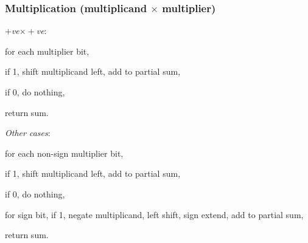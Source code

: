 \subsubsection*{Multiplication (multiplicand $\times$ multiplier)}
\emph{$+$ve$\times+$ve}: \begin{enumerate*}[label=(\arabic*)]
    \item for each multiplier bit,
    \item if 1, shift multiplicand left, add to partial sum,
    \item if 0, do nothing,
    \item return sum.
\end{enumerate*}
\emph{Other cases}: \begin{enumerate*}[label=(\arabic*)]
    \item for each non-sign multiplier bit,
    \item if 1, shift multiplicand left, add to partial sum,
    \item if 0, do nothing,
    \item for sign bit, if 1, negate multiplicand, left shift, sign extend, add to partial sum,
    \item return sum.
\end{enumerate*}